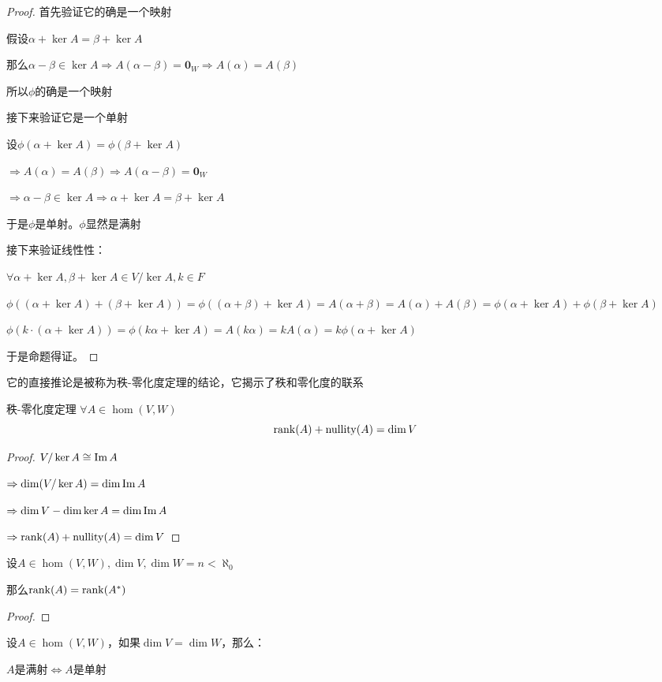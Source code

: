 \documentclass[12pt, a4paper, oneside, UTF8]{ctexbook}
\begin{document}
\begin{para}{0}
\begin{proof}
							首先验证它的确是一个映射

							假设$\alpha +\ker A=\beta +\ker A$

							那么$\alpha -\beta \in \ker A \Rightarrow A(\alpha -\beta )=\mathbf{0}_W \Rightarrow A(\alpha )=A(\beta )$

							所以$\phi $的确是一个映射

							接下来验证它是一个单射

							设$\phi (\alpha + \ker A)=\phi (\beta +\ker A)$
							
							$\Rightarrow A(\alpha )=A(\beta ) \Rightarrow A(\alpha -\beta )=\mathbf{0}_W$

							$\Rightarrow \alpha - \beta  \in \ker A \Rightarrow \alpha +\ker A=\beta +\ker A$

							于是$\phi $是单射。$\phi $显然是满射

							接下来验证线性性：

							$\forall \alpha +\ker A,\beta +\ker A \in V/\ker A,k \in F$
							
							$\phi \left((\alpha +\ker A)+(\beta +\ker A)\right)=\phi \left((\alpha +\beta )+\ker A\right)=A(\alpha +\beta )=A(\alpha )+A(\beta )=\phi (\alpha +\ker A)+\phi (\beta +\ker A)$
						
							$\phi \left(k\cdot (\alpha +\ker A)\right)=\phi (k\alpha +\ker A)=A(k\alpha )=kA(\alpha )=k\phi (\alpha +\ker A)$
						
							于是命题得证。
						\end{proof}

						它的直接推论是被称为秩-零化度定理的结论，它揭示了秩和零化度的联系
						\begin{them}{秩-零化度定理}{}
							$\forall A \in \hom(V,W)$
							\begin{equation}
								\operatorname{rank}(A)+\operatorname{nullity}(A) = \dim V
							\end{equation}
						\end{them}
						\begin{proof}
							$V/\ker A \cong \operatorname{Im} A$

							$\Rightarrow \dim(V/\ker A)=\dim \operatorname{Im} A$

							$\Rightarrow \dim V - \dim \ker A = \dim \operatorname{Im} A$

							$\Rightarrow \operatorname{rank}(A)+\operatorname{nullity}(A)= \dim V$
						\end{proof}
						\begin{proposition}
							设$A \in \hom(V,W),\dim V,\dim W = n < \aleph_0$

							那么$\operatorname{rank}(A)=\operatorname{rank}(A^*)$
						\end{proposition}
						\begin{proof}
							
						\end{proof}
					\point{}
						\begin{proposition}
							设$A \in \hom(V,W)$，如果$\dim V=\dim W$，那么：

							$A$是满射$\Leftrightarrow A$是单射
						\end{proposition}
				\end{para}
\end{document}
